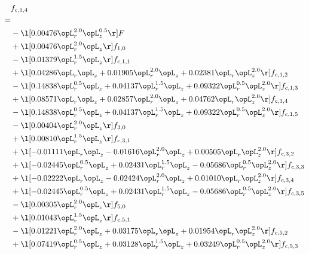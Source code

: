 \begin{alignat}{2} 
\label{eq:f_14_1} 
& f_{c,1,4} \nonumber \\ 
 = \\ 
& - \l[  0.00476 \opL_r^{2.0} \opL_z^{0.5}  \r] F \nonumber \\ 
& + \l[  0.00476 \opL_r^{2.0} \opL_z  \r] f_{1,0} \nonumber \\ 
& - \l[  0.01379 \opL_r^{1.5} \opL_z  \r] f_{c,1,1} \nonumber \\ 
& + \l[  0.04286 \opL_r \opL_z +  0.01905 \opL_r^{2.0} \opL_z +  0.02381 \opL_r \opL_z^{2.0}  \r] f_{c,1,2} \nonumber \\ 
& - \l[  0.14838 \opL_r^{0.5} \opL_z +  0.04137 \opL_r^{1.5} \opL_z +  0.09322 \opL_r^{0.5} \opL_z^{2.0}  \r] f_{c,1,3} \nonumber \\ 
& + \l[  0.08571 \opL_r \opL_z +  0.02857 \opL_r^{2.0} \opL_z +  0.04762 \opL_r \opL_z^{2.0}  \r] f_{c,1,4} \nonumber \\ 
& - \l[  0.14838 \opL_r^{0.5} \opL_z +  0.04137 \opL_r^{1.5} \opL_z +  0.09322 \opL_r^{0.5} \opL_z^{2.0}  \r] f_{c,1,5} \nonumber \\ 
& - \l[  0.00404 \opL_r^{2.0} \opL_z  \r] f_{3,0} \nonumber \\ 
& + \l[  0.00810 \opL_r^{1.5} \opL_z  \r] f_{c,3,1} \nonumber \\ 
& + \l[  -0.01111 \opL_r \opL_z   -0.01616 \opL_r^{2.0} \opL_z +  0.00505 \opL_r \opL_z^{2.0}  \r] f_{c,3,2} \nonumber \\ 
& + \l[  -0.02445 \opL_r^{0.5} \opL_z +  0.02431 \opL_r^{1.5} \opL_z   -0.05686 \opL_r^{0.5} \opL_z^{2.0}  \r] f_{c,3,3} \nonumber \\ 
& + \l[  -0.02222 \opL_r \opL_z   -0.02424 \opL_r^{2.0} \opL_z +  0.01010 \opL_r \opL_z^{2.0}  \r] f_{c,3,4} \nonumber \\ 
& + \l[  -0.02445 \opL_r^{0.5} \opL_z +  0.02431 \opL_r^{1.5} \opL_z   -0.05686 \opL_r^{0.5} \opL_z^{2.0}  \r] f_{c,3,5} \nonumber \\ 
& - \l[  0.00305 \opL_r^{2.0} \opL_z  \r] f_{5,0} \nonumber \\ 
& + \l[  0.01043 \opL_r^{1.5} \opL_z  \r] f_{c,5,1} \nonumber \\ 
& - \l[  0.01221 \opL_r^{2.0} \opL_z +  0.03175 \opL_r \opL_z +  0.01954 \opL_r \opL_z^{2.0}  \r] f_{c,5,2} \nonumber \\ 
& + \l[  0.07419 \opL_r^{0.5} \opL_z +  0.03128 \opL_r^{1.5} \opL_z +  0.03249 \opL_r^{0.5} \opL_z^{2.0}  \r] f_{c,5,3} \nonumber \\ 

\end{alignat}
